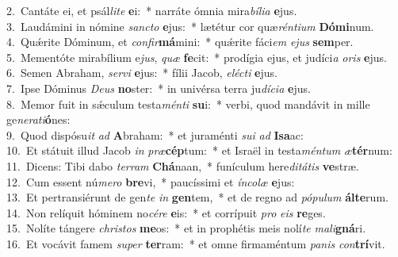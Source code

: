 {2.~}Cantáte ei, et psál\textit{li}\textit{te} \textbf{e}i:~* narráte ómnia mira\textit{bí}\textit{li}\textit{a} \textbf{e}jus.\\
{3.~}Laudámini in nómine \textit{san}\textit{cto} \textbf{e}jus:~* lætétur cor quæ\textit{rén}\textit{ti}\textit{um} \textbf{Dó}\textbf{mi}num.\\
{4.~}Quǽrite Dóminum, et \textit{con}\textit{fir}\textbf{má}mini:~* quǽrite fáci\textit{em} \textit{e}\textit{jus} \textbf{sem}per.\\
{5.~}Mementóte mirabílium e\textit{jus}, \textit{quæ} \textbf{fe}cit:~* prodígia ejus, et judíci\textit{a} \textit{o}\textit{ris} \textbf{e}jus.\\
{6.~}Semen Abraham, \textit{ser}\textit{vi} \textbf{e}jus:~* fílii Jacob, \textit{e}\textit{lé}\textit{cti} \textbf{e}jus.\\
{7.~}Ipse Dóminus \textit{De}\textit{us} \textbf{no}ster:~* in univérsa terra ju\textit{dí}\textit{ci}\textit{a} \textbf{e}jus.\\
{8.~}Memor fuit in sǽculum testa\textit{mén}\textit{ti} \textbf{su}i:~* verbi, quod mandávit in mille ge\textit{ne}\textit{ra}\textit{ti}\textbf{ó}nes:\\
{9.~}Quod dispósu\textit{it} \textit{ad} \textbf{A}braham:~* et juraménti \textit{su}\textit{i} \textit{ad} \textbf{I}\textbf{sa}ac:\\
{10.~}Et státuit illud Jacob \textit{in} \textit{præ}\textbf{cép}tum:~* et Israël in testa\textit{mén}\textit{tum} \textit{æ}\textbf{tér}num:\\
{11.~}Dicens: Tibi dabo \textit{ter}\textit{ram} \textbf{Chá}naan,~* funículum here\textit{di}\textit{tá}\textit{tis} \textbf{ve}stræ.\\
{12.~}Cum essent nú\textit{me}\textit{ro} \textbf{bre}vi,~* paucíssimi et \textit{ín}\textit{co}\textit{læ} \textbf{e}jus:\\
{13.~}Et pertransiérunt de gen\textit{te} \textit{in} \textbf{gen}tem,~* et de regno ad \textit{pó}\textit{pu}\textit{lum} \textbf{ál}\textbf{te}rum.\\
{14.~}Non relíquit hóminem no\textit{cé}\textit{re} \textbf{e}is:~* et corrípuit \textit{pro} \textit{e}\textit{is} \textbf{re}ges.\\
{15.~}Nolíte tángere \textit{chri}\textit{stos} \textbf{me}os:~* et in prophétis meis nolí\textit{te} \textit{ma}\textit{li}\textbf{gná}ri.\\
{16.~}Et vocávit famem \textit{su}\textit{per} \textbf{ter}ram:~* et omne firmaméntum \textit{pa}\textit{nis} \textit{con}\textbf{trí}vit.\\
